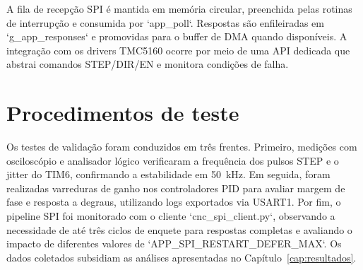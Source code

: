 A fila de recepção SPI é mantida em memória circular, preenchida pelas
rotinas de interrupção e consumida por `app_poll`. Respostas são
enfileiradas em `g_app_responses` e promovidas para o buffer de DMA
quando disponíveis. A integração com os drivers TMC5160 ocorre por meio
de uma API dedicada que abstrai comandos STEP/DIR/EN e monitora
condições de falha.

\section{Procedimentos de teste}

Os testes de validação foram conduzidos em três frentes. Primeiro,
medições com osciloscópio e analisador lógico verificaram a frequência
dos pulsos STEP e o jitter do TIM6, confirmando a estabilidade em
\SI{50}{\kilo\hertz}. Em seguida, foram realizadas varreduras de ganho
nos controladores PID para avaliar margem de fase e resposta a degraus,
utilizando logs exportados via USART1. Por fim, o pipeline SPI foi
monitorado com o cliente `cnc_spi_client.py`, observando a necessidade de
até três ciclos de enquete para respostas completas e avaliando o
impacto de diferentes valores de `APP_SPI_RESTART_DEFER_MAX`. Os dados
coletados subsidiam as análises apresentadas no
Capítulo~\ref{cap:resultados}.